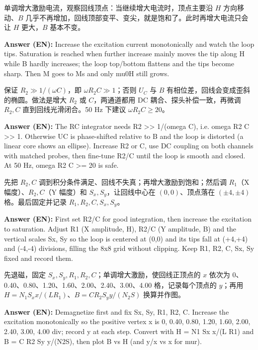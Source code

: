 \documentclass[11pt]{ctexart}
\begin{document}
单调增大激励电流，观察回线顶点：当继续增大电流时，顶点主要沿 \(H\) 方向移动、\(B\) 几乎不再增加，回线顶部变平、变尖，就是饱和了。此时再增大电流只会让 \(H\) 更大，\(B\) 基本不变。

\textbf{Answer (EN):} Increase the excitation current monotonically and watch the loop tips. Saturation is reached when further increase mainly moves the tip along H while B hardly increases; the loop top/bottom flattens and the tips become sharp. Then M goes to Ms and only mu0H still grows.

保证 \(R_2\gg1/(\omega C)\)，即 \(\omega R_2C\gg1\)；否则 \(U_C\) 与 \(B\) 有相位差，回线会变成歪斜的椭圆。做法是增大 \(R_2\) 或 \(C\)，两通道都用 DC 耦合、探头补偿一致，再微调 \(R_2,C\) 直到回线光滑闭合。50 Hz 下建议 \(\omega R_2C\ge20\)。

\textbf{Answer (EN):} The RC integrator needs R2 >> 1/(omega C), i.e. omega R2 C >> 1. Otherwise UC is phase-shifted relative to B and the loop is distorted (a linear core shows an ellipse). Increase R2 or C, use DC coupling on both channels with matched probes, then fine-tune R2/C until the loop is smooth and closed. At 50 Hz, omega R2 C >= 20 is safe.

先把 \(R_2,C\) 调到积分条件满足、回线不失真；再增大激励到饱和；然后调 \(R_1\)（X 幅度）、\(R_2,C\)（Y 幅度）和 \(S_x,S_y\)，让回线中心在 \((0,0)\)、顶点落在 \((\pm4,\pm4)\) 格。最后固定并记录 \(R_1,R_2,C,S_x,S_y\)。

\textbf{Answer (EN):} First set R2/C for good integration, then increase the excitation to saturation. Adjust R1 (X amplitude, H), R2/C (Y amplitude, B) and the vertical scales Sx, Sy so the loop is centered at (0,0) and its tips fall at (+4,+4) and (-4,-4) divisions, filling the 8x8 grid without clipping. Keep R1, R2, C, Sx, Sy fixed and record them.

先退磁，固定 \(S_x,S_y,R_1,R_2,C\)；单调增大激励，使回线正顶点的 \(x\) 依次为 0、0.40、0.80、1.20、1.60、2.00、2.40、3.00、4.00 格，记录每个顶点的 \(y\)；再用 \(H=N_1S_x x/(LR_1)\)、\(B=CR_2S_y y/(N_2S)\) 换算并作图。

\textbf{Answer (EN):} Demagnetize first and fix Sx, Sy, R1, R2, C. Increase the excitation monotonically so the positive vertex x is 0, 0.40, 0.80, 1.20, 1.60, 2.00, 2.40, 3.00, 4.00 div; record y at each step. Convert with H = N1 Sx x/(L R1) and B = C R2 Sy y/(N2S), then plot B vs H (and y/x vs x for mur).
\end{document}
